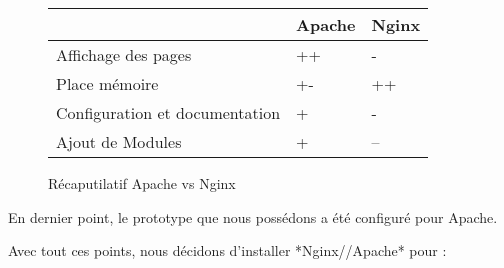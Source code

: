\begin{figure}[h]
\begin{center}
\begin{tabular}{|m{175pt}|m{50pt}|m{50pt}|}
	\hline
	\null & \textbf{Apache} & \textbf{Nginx} \\
	\hline
	Affichage des pages & ++ & -\\
	\hline
	Place mémoire & +- & ++\\
	\hline
	Configuration et documentation & + & - \\
	\hline
	Ajout de Modules & + & -- \\
	\hline
\end{tabular} \vspace*{5mm}
\caption{Récaputilatif Apache vs Nginx}
\end{center}
\end{figure}

En dernier point, le prototype que nous possédons a été configuré pour Apache.

Avec tout ces points, nous décidons d'installer *Nginx//Apache* pour :

